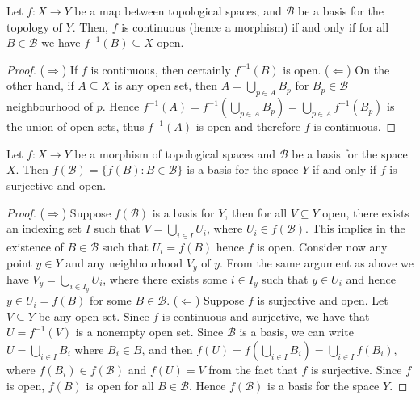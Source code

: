 \begin{proposition}
Let \(f: X \to Y\) be a map between topological spaces, and \(\mathcal B\) be
a basis for the topology of \(Y\). Then, \(f\) is continuous (hence a
morphism) if and only if for all \(B \in \mathcal B\) we have \(f^{-1}(B)
\subseteq X\) open.
\end{proposition}

\begin{proof}
(\(\Rightarrow\)) If \(f\) is continuous, then certainly \(f^{-1}(B)\) is
open. (\(\Leftarrow\)) On the other hand, if \(A \subseteq X\) is any open
set, then \(A = \bigcup_{p \in A} B_p\) for \(B_p \in \mathcal B\)
neighbourhood of \(p\). Hence \(f^{-1}(A) = f^{-1} (\bigcup_{p \in A}
B_p) = \bigcup_{p \in A} f^{-1}(B_p)\) is the union of open sets, thus
\(f^{-1}(A)\) is open and therefore \(f\) is continuous.
\end{proof}

\begin{proposition}\label{prop: basis image surjective}
Let \(f: X \to Y\) be a morphism of topological spaces and \(\mathcal B\) be a
basis for the space \(X\). Then \(f(\mathcal B) = \{f(B): B \in \mathcal B\}\)
is a basis for the space \(Y\) if and only if \(f\) is surjective and open.
\end{proposition}

\begin{proof}
(\(\Rightarrow\)) Suppose \(f(\mathcal B)\) is a basis for \(Y\), then for all
\(V \subseteq Y\) open, there exists an indexing set \(I\) such that \(V =
\bigcup_{i \in  I} U_i\), where \(U_i \in f(\mathcal B)\). This implies in the
existence of \(B \in \mathcal B\) such that \(U_i = f(B)\) hence \(f\) is
open. Consider now any point \(y \in Y\) and any neighbourhood \(V_y\) of
\(y\). From the same argument as above we have \(V_y = \bigcup_{i \in  I_y}
U_i\), where there exists some \(i \in I_y\) such that \(y \in U_i\) and hence
\(y \in U_i = f(B)\) for some \(B \in \mathcal B\).
(\(\Leftarrow\)) Suppose \(f\) is surjective and open. Let \(V \subseteq Y\)
be any open set. Since \(f\) is continuous and surjective, we have that
\(U = f^{-1}(V)\) is a nonempty open set. Since \(\mathcal B\) is a basis, we
can write \(U = \bigcup_{i \in  I} B_i\) where \(B_i \in B\), and then \(f(U)
= f\left( \bigcup_{i \in  I} B_i \right) = \bigcup_{i \in I} f(B_i)\), where
\(f(B_i) \in f(\mathcal B)\) and \(f(U) = V\) from the fact that \(f\) is
surjective. Since \(f\) is open, \(f(B)\) is open for all \(B \in \mathcal
B\). Hence \(f(\mathcal B)\) is a basis for the space \(Y\).
\end{proof}

